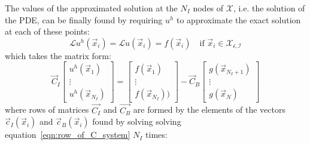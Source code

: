 \medskip
The values of the approximated solution at the $N_I$ nodes of $\mathcal{X}$, i.e. the solution of the PDE, can be finally found by requiring $u^h$ to approximate the exact solution at each of these points:
\begin{equation}
	\mathcal{L}u^h(\vec{x}_i) = \mathcal{L}u(\vec{x}_i) = f(\vec{x}_i)  \quad  \text{if $\vec{x}_i \in \mathcal{X_{i,I}}$}
\end{equation}
which takes the matrix form:
\begin{equation}
\label{eqn:discretized_version_of_PDE_using_RBF-FD}
\vec{C}_I
\begin{bmatrix}
	u^h(\vec{x}_1)  \\
	\vdots			\\
	u^h(\vec{x}_{N_I})
\end{bmatrix}
=
\begin{bmatrix}
	f(\vec{x}_1)  \\
	\vdots		  \\
	f(\vec{x}_{N_I}))
\end{bmatrix}
-
\vec{C}_B
\begin{bmatrix}
	g(\vec{x}_{N_I+1})  \\
	\vdots				\\
	g(\vec{x}_{N})
\end{bmatrix}
\end{equation}
where rows of matrices $\vec{C_I}$ and $\vec{C_B}$ are formed by the elements of the vectors $\vec{c}_I(\vec{x}_i)$ and $\vec{c}_B(\vec{x}_i)$ found by solving solving equation~\eqref{eqn:row_of_C_system} $N_I$ times:

